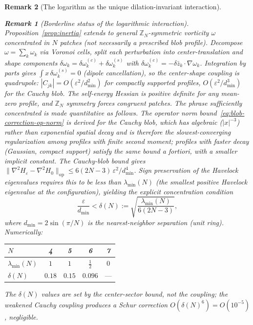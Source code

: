 \documentclass[12pt, a4paper]{article}
\newtheorem{remark}{Remark}[section]
\numberwithin{equation}{section}
\begin{document}
\begin{remark}[The logarithm as the unique dilation-invariant interaction]
\begin{remark}[Borderline status of the logarithmic interaction]
Proposition~\ref{prop:inertia} extends to \emph{general}
$\mathbb{Z}_N$-symmetric vorticity $\omega$ concentrated in
$N$ patches (not necessarily a prescribed blob profile).
Decompose $\omega = \sum_k \omega_k$ via Voronoi cells,
split each perturbation into center-translation and shape
components $\delta\omega_k = \delta\omega_k^{(c)} + \delta\omega_k^{(s)}$
with $\delta\omega_k^{(c)} = -\delta\bar z_k \cdot \nabla\omega_k$.
Integration by parts gives
$\int x\,\delta\omega_k^{(s)} = 0$ (dipole cancellation),
so the center-shape coupling is quadrupole:
$|C_{jk}| = O(\varepsilon^2/d_{\min}^2)$ for compactly supported
profiles, $O(\varepsilon^2/d_{\min}^3)$ for the Cauchy blob.
The self-energy Hessian is positive definite for any mean-zero
profile, and $\mathbb{Z}_N$ symmetry forces congruent patches.
The phrase
\emph{sufficiently concentrated} is made quantitative as follows.
The operator norm bound~\eqref{eq:blob-correction-op-norm} is
derived for the Cauchy blob, which has algebraic ($|x|^{-3}$) rather
than exponential spatial decay and is therefore the
slowest-converging regularization among profiles with finite
second moment; profiles with faster decay (Gaussian, compact support)
satisfy the same bound \emph{a fortiori}, with a smaller implicit
constant.  The Cauchy-blob bound gives
$\|\nabla^2\!H_\varepsilon - \nabla^2\!H_0\|_{\mathrm{op}}
\le 6(2N{-}3)\,\varepsilon^2/d_{\min}^4$.
Sign preservation of the Havelock eigenvalues requires this to be
less than $\lambda_{\min}(N)$ (the smallest positive Havelock eigenvalue
at the configuration), yielding the explicit concentration condition
\begin{equation}\label{eq:concentration-bound}
  \frac{\varepsilon}{d_{\min}} < \delta(N)
  := \sqrt{\frac{\lambda_{\min}(N)}{6(2N-3)}},
\end{equation}
where $d_{\min} = 2\sin(\pi/N)$ is the nearest-neighbor separation
(unit ring).  Numerically:
\begin{center}
\begin{tabular}{lcccc}
\toprule
$N$ & 4 & 5 & 6 & 7 \\
\midrule
$\lambda_{\min}(N)$ & $1$ & $1$ & $\frac{1}{2}$ & $0$ \\[3pt]
$\delta(N)$ & $0.18$ & $0.15$ & $0.096$ & $\text{---}$ \\
\bottomrule
\end{tabular}
\end{center}
\noindent
The $\delta(N)$ values are set by the center-sector bound, not
the coupling; the weakened Cauchy coupling produces a Schur
correction $O(\delta(N)^6) = O(10^{-5})$, negligible.


\end{remark}
\end{remark}
\end{document}
